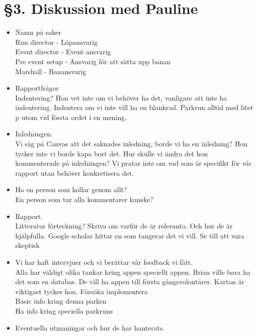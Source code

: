\documentclass[a4paper, 11pt]{article}
\begin{document}
\section*{§3. Diskussion med Pauline}
\begin{itemize}
    \item Namn på saker\\
    Run director - Löpansvarig\\
    Event director - Event ansvarig\\
    Pre event setup - Ansvarig för att sätta upp banan\\
    Marshall - Banansvarig
    \item Rapportfrågor\\
    Indentering? Hon vet inte om vi behöver ha det, vanligare att inte ha indentering. Indentera om vi inte vill ha en blankrad.  Parkrun alltid med litet p utom vid första ordet i en mening.
    \item Inledningen.\\
    Vi såg på Canvas att det saknades inledning, borde vi ha en inledning? Hon tycker inte vi borde kapa bort det.
    Hur skulle vi ändra det hon kommenterade på inledningen? Vi pratar inte om vad som är specifikt för vår rapport utan behöver konkretisera det.
    \item Ha en person som kollar genom allt?\\
    En person som tar alla kommentarer kanske? 
    \item Rapport.\\
    Litteratur förteckning?
    Skriva om varför de är relevanta. 
    Och hur de är hjälpfulla. Google scholar hittar en som tangerar det vi vill. Se till att vara skeptisk 
    \item Vi har haft intervjuer och vi berättar vår feedback vi fått.\\
    Alla har väldigt olika tankar kring appen speciellt appen. 
    Brian ville bara ha det som en databas.
    De vill ha appen till första gångsvolontärer.
    Kartan är viktigast tycker hon. 
    Försöka implementera \\
    Basic info kring denna parken\\
    Ha info kring speciella parkruns
    \item Eventuella utmaningar och hur de har hanterats.\\
\end{itemize}
\end{document}
